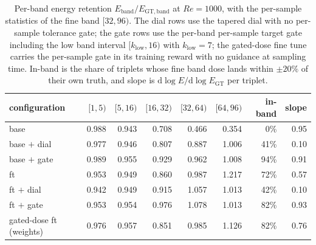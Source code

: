 \begin{table}[H]
  \centering
  \caption{Per-band energy retention $E_{\mathrm{band}}/E_{\mathrm{GT,band}}$ at $Re{=}1000$, with the per-sample statistics of the fine band $[32,96)$. The dial rows use the tapered dial with no per-sample tolerance gate; the gate rows use the per-band per-sample target gate including the low band interval $[k_{\mathrm{low}},16)$ with $k_{\mathrm{low}}=7$; the gated-dose fine tune carries the per-sample gate in its training reward with no guidance at sampling time. In-band is the share of triplets whose fine band dose lands within $\pm20\%$ of their own truth, and slope is $\mathrm{d}\log E/\mathrm{d}\log E_{\mathrm{GT}}$ per triplet.}
  \label{tab:re1k-perband-gated}
  \begin{tabular}{lrrrrrrr}
    \toprule
    configuration & $[1,5)$ & $[5,16)$ & $[16,32)$ & $[32,64)$ & $[64,96)$ & in-band & slope \\
    \midrule
    base & 0.988 & 0.943 & 0.708 & 0.466 & 0.354 & 0\% & 0.95 \\
    base $+$ dial & 0.977 & 0.946 & 0.807 & 0.887 & 1.006 & 41\% & 0.10 \\
    base $+$ gate & 0.989 & 0.955 & 0.929 & 0.962 & 1.008 & 94\% & 0.91 \\
    \midrule
    ft & 0.953 & 0.949 & 0.860 & 0.987 & 1.217 & 72\% & 0.57 \\
    ft $+$ dial & 0.942 & 0.949 & 0.915 & 1.057 & 1.013 & 42\% & 0.10 \\
    ft $+$ gate & 0.953 & 0.954 & 0.976 & 1.078 & 1.013 & 82\% & 0.93 \\
    \midrule
    gated-dose ft (weights) & 0.976 & 0.957 & 0.851 & 0.985 & 1.126 & 82\% & 0.76 \\
    \bottomrule
  \end{tabular}
\end{table}
